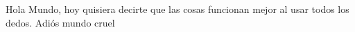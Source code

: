 \documentclass{standalone}
\begin{document}
Hola Mundo, hoy quisiera decirte que las cosas funcionan mejor al usar todos los dedos.
Adi\'os mundo cruel
\end{document}
